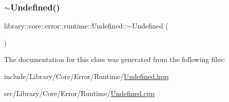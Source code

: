 \mbox{\label{classlibrary_1_1core_1_1error_1_1runtime_1_1Undefined_a9069574e62bbe7aabab0519b6052cb69}} 
\subsubsection{\texorpdfstring{$\sim$\+Undefined()}{~Undefined()}}
{\footnotesize\ttfamily library\+::core\+::error\+::runtime\+::\+Undefined\+::$\sim$\+Undefined (\begin{DoxyParamCaption}{ }\end{DoxyParamCaption})}



The documentation for this class was generated from the following files\+:\begin{DoxyCompactItemize}
\item 
include/\+Library/\+Core/\+Error/\+Runtime/\hyperlink{Undefined_8hpp}{Undefined.\+hpp}\item 
src/\+Library/\+Core/\+Error/\+Runtime/\hyperlink{Undefined_8cpp}{Undefined.\+cpp}\end{DoxyCompactItemize}
